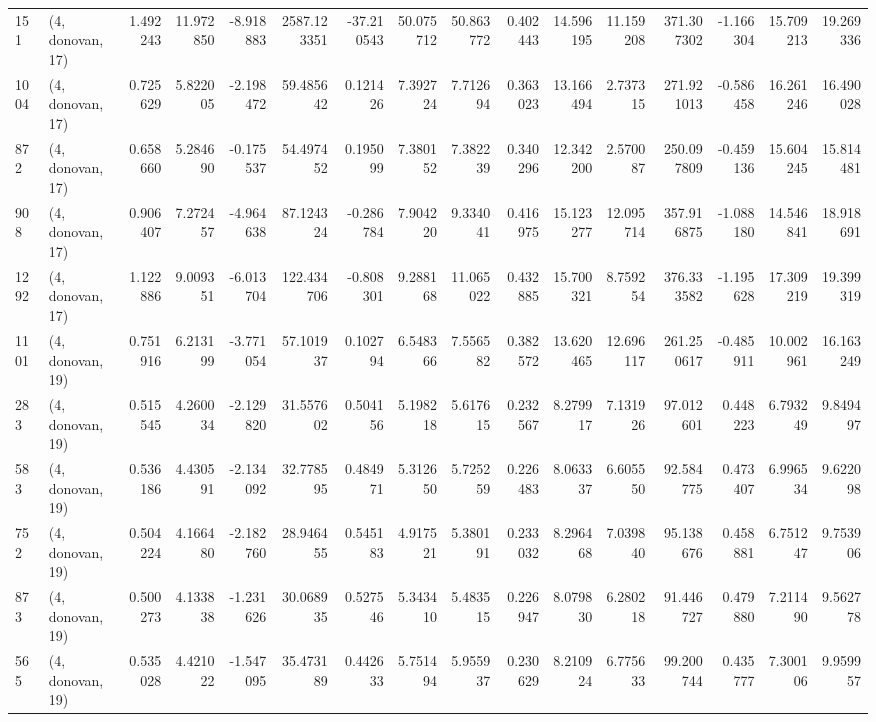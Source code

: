 \begin{tabular}{llrrrrrrrrrrrrrr}
151  &  (4, donovan, 17) &   1.492243 &  11.972850 &  -8.918883 &   2587.123351 &  -37.210543 &   50.075712 &   50.863772 &  0.402443 &  14.596195 &  11.159208 &   371.307302 &  -1.166304 &  15.709213 &  19.269336 \\
1004 &  (4, donovan, 17) &   0.725629 &   5.822005 &  -2.198472 &     59.485642 &    0.121426 &    7.392724 &    7.712694 &  0.363023 &  13.166494 &   2.737315 &   271.921013 &  -0.586458 &  16.261246 &  16.490028 \\
872  &  (4, donovan, 17) &   0.658660 &   5.284690 &  -0.175537 &     54.497452 &    0.195099 &    7.380152 &    7.382239 &  0.340296 &  12.342200 &   2.570087 &   250.097809 &  -0.459136 &  15.604245 &  15.814481 \\
908  &  (4, donovan, 17) &   0.906407 &   7.272457 &  -4.964638 &     87.124324 &   -0.286784 &    7.904220 &    9.334041 &  0.416975 &  15.123277 &  12.095714 &   357.916875 &  -1.088180 &  14.546841 &  18.918691 \\
1292 &  (4, donovan, 17) &   1.122886 &   9.009351 &  -6.013704 &    122.434706 &   -0.808301 &    9.288168 &   11.065022 &  0.432885 &  15.700321 &   8.759254 &   376.333582 &  -1.195628 &  17.309219 &  19.399319 \\
1101 &  (4, donovan, 19) &   0.751916 &   6.213199 &  -3.771054 &     57.101937 &    0.102794 &    6.548366 &    7.556582 &  0.382572 &  13.620465 &  12.696117 &   261.250617 &  -0.485911 &  10.002961 &  16.163249 \\
283  &  (4, donovan, 19) &   0.515545 &   4.260034 &  -2.129820 &     31.557602 &    0.504156 &    5.198218 &    5.617615 &  0.232567 &   8.279917 &   7.131926 &    97.012601 &   0.448223 &   6.793249 &   9.849497 \\
583  &  (4, donovan, 19) &   0.536186 &   4.430591 &  -2.134092 &     32.778595 &    0.484971 &    5.312650 &    5.725259 &  0.226483 &   8.063337 &   6.605550 &    92.584775 &   0.473407 &   6.996534 &   9.622098 \\
752  &  (4, donovan, 19) &   0.504224 &   4.166480 &  -2.182760 &     28.946455 &    0.545183 &    4.917521 &    5.380191 &  0.233032 &   8.296468 &   7.039840 &    95.138676 &   0.458881 &   6.751247 &   9.753906 \\
873  &  (4, donovan, 19) &   0.500273 &   4.133838 &  -1.231626 &     30.068935 &    0.527546 &    5.343410 &    5.483515 &  0.226947 &   8.079830 &   6.280218 &    91.446727 &   0.479880 &   7.211490 &   9.562778 \\
565  &  (4, donovan, 19) &   0.535028 &   4.421022 &  -1.547095 &     35.473189 &    0.442633 &    5.751494 &    5.955937 &  0.230629 &   8.210924 &   6.775633 &    99.200744 &   0.435777 &   7.300106 &   9.959957 \\

\end{tabular}
